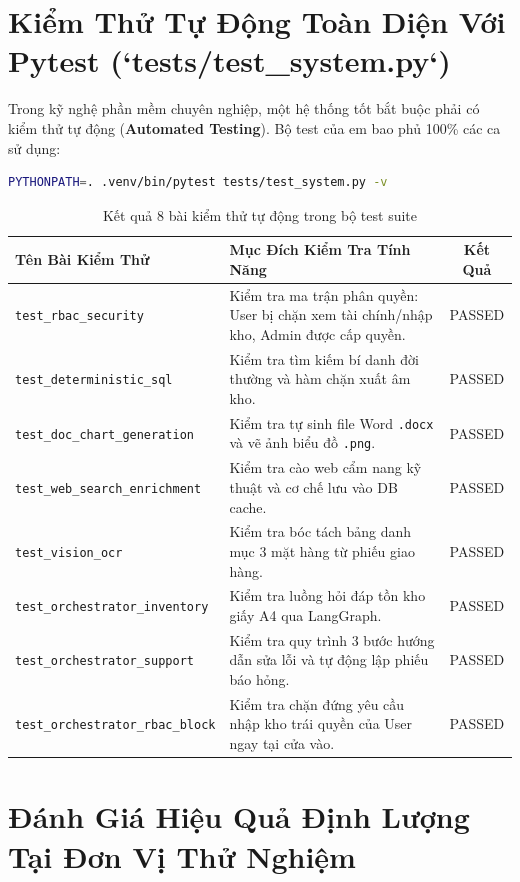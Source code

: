 \documentclass[11pt,a4paper]{article}
\begin{document}
\section{Kiểm Thử Tự Động Toàn Diện Với Pytest (`tests/test\_system.py`)}

Trong kỹ nghệ phần mềm chuyên nghiệp, một hệ thống tốt bắt buộc phải có kiểm thử tự động (\textbf{Automated Testing}). Bộ test của em bao phủ 100\% các ca sử dụng:

\begin{lstlisting}[language=bash]
PYTHONPATH=. .venv/bin/pytest tests/test_system.py -v
\end{lstlisting}

\begin{table}[H]
\centering
\small
\begin{tabularx}{\textwidth}{l X c}
\toprule
\textbf{Tên Bài Kiểm Thử} & \textbf{Mục Đích Kiểm Tra Tính Năng} & \textbf{Kết Quả} \\
\midrule
\texttt{test\_rbac\_security} & Kiểm tra ma trận phân quyền: User bị chặn xem tài chính/nhập kho, Admin được cấp quyền. & PASSED \\
\texttt{test\_deterministic\_sql} & Kiểm tra tìm kiếm bí danh đời thường và hàm chặn xuất âm kho. & PASSED \\
\texttt{test\_doc\_chart\_generation} & Kiểm tra tự sinh file Word \texttt{.docx} và vẽ ảnh biểu đồ \texttt{.png}. & PASSED \\
\texttt{test\_web\_search\_enrichment} & Kiểm tra cào web cẩm nang kỹ thuật và cơ chế lưu vào DB cache. & PASSED \\
\texttt{test\_vision\_ocr} & Kiểm tra bóc tách bảng danh mục 3 mặt hàng từ phiếu giao hàng. & PASSED \\
\texttt{test\_orchestrator\_inventory} & Kiểm tra luồng hỏi đáp tồn kho giấy A4 qua LangGraph. & PASSED \\
\texttt{test\_orchestrator\_support} & Kiểm tra quy trình 3 bước hướng dẫn sửa lỗi và tự động lập phiếu báo hỏng. & PASSED \\
\texttt{test\_orchestrator\_rbac\_block} & Kiểm tra chặn đứng yêu cầu nhập kho trái quyền của User ngay tại cửa vào. & PASSED \\
\bottomrule
\end{tabularx}
\caption{Kết quả 8 bài kiểm thử tự động trong bộ test suite}
\end{table}

\section{Đánh Giá Hiệu Quả Định Lượng Tại Đơn Vị Thử Nghiệm}
\end{document}
